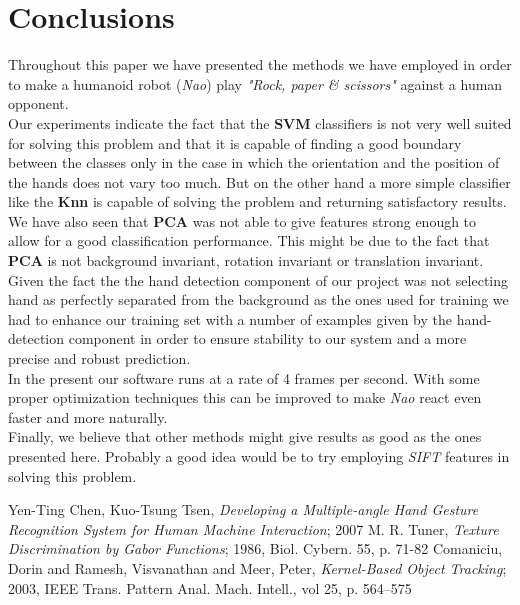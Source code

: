 \documentclass[a4paper, 11pt, twocolumn]{article}
\begin{document}
    \section{Conclusions}
	\label{sec:conclusion}
		Throughout this paper we have presented the methods we have employed in order to make a humanoid robot (\emph{Nao}) play \emph{"Rock, paper \& scissors"} against a human opponent.\\
 		\hspace*{10px}Our experiments indicate the fact that the \textbf{SVM} classifiers is not very well suited for solving this problem and that it is capable of finding a good boundary between the classes only in the case in which the orientation and the position of the hands does not vary too much. But on the other hand a more simple classifier like the \textbf{Knn} is capable of solving the problem and returning satisfactory results.\\
		\hspace*{10px}We have also seen that \textbf{PCA} was not able to give features strong enough to allow for a good classification performance. This might be due to the fact that \textbf{PCA} is not background invariant, rotation invariant or translation invariant.\\
		\hspace*{10px}Given the fact the the hand detection component of our project was not selecting hand as perfectly separated from the background as the ones used for training we had to enhance our training set with a number of examples given by the hand-detection component in order to ensure stability to our system and a more precise and robust prediction.\\
		\hspace*{10px}In the present our software runs at a rate of 4 frames per second. With some proper optimization techniques this can be improved to make \emph{Nao} react even faster and more naturally.\\
		\hspace*{10px}Finally, we believe that other methods might give results as good as the ones presented here. Probably a good idea would be to try employing \emph{SIFT} features in solving this problem.
	\begin{thebibliography}{2}
		Yen-Ting Chen, Kuo-Tsung Tsen, \emph{Developing a Multiple-angle Hand Gesture Recognition System for Human Machine Interaction}; 2007
		M. R. Tuner, \emph{Texture Discrimination by Gabor Functions}; 1986, Biol. Cybern. 55, p. 71-82 
		Comaniciu, Dorin and Ramesh, Visvanathan and Meer, Peter, \emph{Kernel-Based Object Tracking}; 2003, IEEE Trans. Pattern Anal. Mach. Intell., vol 25, p. 564--575
	\end{thebibliography}    
\end{document}
